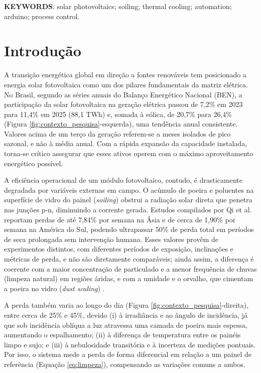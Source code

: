 \documentclass[a4paper,11pt]{article}
\begin{document}
\vspace{0.5cm}
\noindent\textbf{KEYWORDS}: solar photovoltaics; soiling; thermal cooling; automation; arduino; process control.

\section*{Introdução}

A transição energética global em direção a fontes renováveis tem posicionado a energia solar fotovoltaica como um dos pilares fundamentais da matriz elétrica. No Brasil, segundo as séries anuais do Balanço Energético Nacional (BEN), a participação da solar fotovoltaica na geração elétrica passou de 7,2\% em 2023 para 11,4\% em 2025 (88,1 TWh) e, somada à eólica, de 20,7\% para 26,4\% \cite{epe_ben2025, epe_ben2026} (Figura \ref{fig:contexto_pesquisa}-esquerda), uma tendência anual consistente. Valores acima de um terço da geração \cite{ember_brazil_2024} referem-se a meses isolados de pico sazonal, e não à média anual. Com a rápida expansão da capacidade instalada, torna-se crítico assegurar que esses ativos operem com o máximo aproveitamento energético possível.

A eficiência operacional de um módulo fotovoltaico, contudo, é drasticamente degradada por variáveis externas em campo. O acúmulo de poeira e poluentes na superfície de vidro do painel (\textit{soiling}) obstrui a radiação solar direta que penetra nas junções p-n, diminuindo a corrente gerada. Estudos compilados por Qi et al. \cite{qi2025} reportam perdas de até 7,84\% por semana na Ásia e de cerca de 1,90\% por semana na América do Sul, podendo ultrapassar 50\% de perda total em períodos de seca prolongada sem intervenção humana. Esses valores provêm de experimentos distintos, com diferentes períodos de exposição, inclinações e métricas de perda, e não são diretamente comparáveis; ainda assim, a diferença é coerente com a maior concentração de particulado e a menor frequência de chuvas (limpeza natural) em regiões áridas, e com a umidade e o orvalho, que cimentam a poeira no vidro (\textit{dust scaling}) \cite{qi2025}.

A perda também varia ao longo do dia (Figura \ref{fig:contexto_pesquisa}-direita), entre cerca de 25\% e 45\%, devido (i) à irradiância e ao ângulo de incidência, já que sob incidência oblíqua a luz atravessa uma camada de poeira mais espessa, aumentando o espalhamento; (ii) à diferença de temperatura entre os painéis limpo e sujo; e (iii) à nebulosidade transitória e à incerteza de medições pontuais. Por isso, o sistema mede a perda de forma diferencial em relação a um painel de referência (Equação \ref{eq:limpeza}), compensando as variações comuns a ambos.
\end{document}

